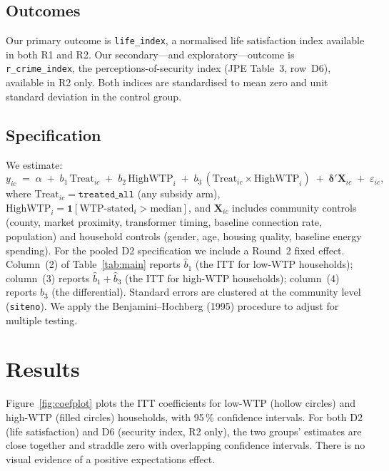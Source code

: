 \documentclass[12pt]{article}
\begin{document}
\subsection*{Outcomes}

Our primary outcome is \texttt{life\_index}, a normalised life satisfaction
index available in both R1 and R2. Our secondary---and exploratory---outcome
is \texttt{r\_crime\_index}, the perceptions-of-security index (JPE
Table~3, row~D6), available in R2 only. Both indices are standardised to
mean zero and unit standard deviation in the control group.

\subsection*{Specification}

We estimate:
\begin{equation}
\label{eq:spec}
y_{ic} \;=\; \alpha
  \;+\; b_1\,\text{Treat}_{ic}
  \;+\; b_2\,\text{HighWTP}_{i}
  \;+\; b_3\,(\text{Treat}_{ic} \times \text{HighWTP}_{i})
  \;+\; \boldsymbol{\delta}'\mathbf{X}_{ic}
  \;+\; \varepsilon_{ic},
\end{equation}
where $\text{Treat}_{ic}=\texttt{treated\_all}$ (any subsidy arm),
$\text{HighWTP}_i = \mathbf{1}[\text{WTP-stated}_i > \text{median}]$,
and $\mathbf{X}_{ic}$ includes community controls (county, market
proximity, transformer timing, baseline connection rate, population) and
household controls (gender, age, housing quality, baseline energy
spending). For the pooled D2 specification we include a Round~2 fixed
effect. Column~(2) of Table~\ref{tab:main} reports $\hat{b}_1$ (the
ITT for low-WTP households); column~(3) reports $\hat{b}_1+\hat{b}_3$
(the ITT for high-WTP households); column~(4) reports $\hat{b}_3$ (the
differential). Standard errors are clustered at the community level
(\texttt{siteno}). We apply the Benjamini--Hochberg (1995) procedure to
adjust for multiple testing.

\section{Results}
\label{sec:results}

Figure~\ref{fig:coefplot} plots the ITT coefficients for low-WTP (hollow
circles) and high-WTP (filled circles) households, with 95\,\% confidence
intervals. For both D2 (life satisfaction) and D6 (security index, R2
only), the two groups' estimates are close together and straddle zero with
overlapping confidence intervals. There is no visual evidence of a positive
expectations effect.
\end{document}
